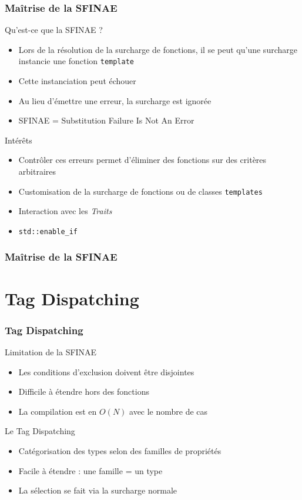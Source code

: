 \documentclass[svgnames]{beamer}
\begin{document}
\frame
{
  \frametitle{Maîtrise de la SFINAE}
  \begin{block}{Qu'est-ce que la SFINAE ?}
  \begin{itemize}
  \footnotesize
  \item Lors de la r\'esolution de la surcharge de fonctions, il se peut qu'une 
  surcharge instancie une fonction \texttt{template}
  \item Cette instanciation peut \'echouer
  \item Au lieu d'émettre une erreur, la surcharge est ignor\'ee
  \item SFINAE = Substitution Failure Is Not An Error
  \end{itemize}
  \end{block}

  \begin{overlayarea}{\textwidth}{5cm}
  {
    \begin{block}{Intérêts}
    \begin{itemize}
    \footnotesize
    \item Contrôler ces erreurs permet d'éliminer des fonctions sur des critères
    arbitraires
    \item Customisation de la surcharge de fonctions ou de classes \texttt{templates}
    \item Interaction avec les \textit{Traits}
    \item \texttt{std::enable\_if}
    \end{itemize}
    \end{block}
  }
  \end{overlayarea}
}

\frame
{
  \frametitle{Maîtrise de la SFINAE}
}

\section{Tag Dispatching}
\begin{frame}
\frametitle{Tag Dispatching}
\begin{block}{Limitation de la SFINAE}
\begin{itemize}
\item Les conditions d'exclusion doivent être disjointes
\item Difficile à étendre hors des fonctions
\item La compilation est en $O(N)$ avec le nombre de cas
\end{itemize}
\end{block}

\begin{block}{Le Tag Dispatching}
\begin{itemize}
\item Catégorisation des types selon des familles de propriétés
\item Facile à étendre : une famille = un type
\item La sélection se fait via la surcharge normale
\end{itemize}
\end{block}
\end{frame}
\end{document}
